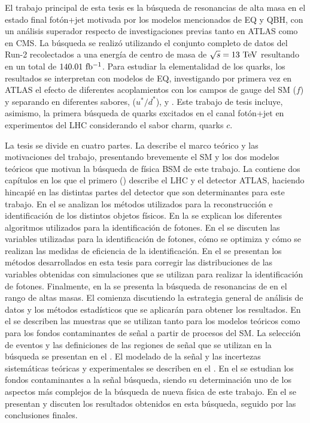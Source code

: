 El trabajo principal de esta tesis es la búsqueda de resonancias de alta masa en el estado final fotón+jet motivada por los modelos mencionados de \ac{EQ} y \ac{QBH}, con un análisis superador respecto de investigaciones previas tanto en \ac{ATLAS} como en \ac{CMS}. La búsqueda se realizó utilizando el conjunto completo de datos del Run-2 recolectados a una energía de centro de masa de \(\sqs = 13~\TeV\) resultando en un total de \(140.01~\ifb\). Para estudiar la elementalidad de los quarks, los resultados se interpretan con modelos de \ac{EQ}, investigando por primera vez en \ac{ATLAS} el efecto de diferentes acoplamientos con los campos de gauge del \ac{SM} (\(f\)) y separando en diferentes sabores, \qstar (\(u^*/d^*\)), \cstar y \bstar. Este trabajo de tesis incluye, asimismo, la primera búsqueda de quarks excitados en el canal fotón+jet en experimentos del \ac{LHC} considerando el sabor charm, quarks \(c\).

La tesis se divide en cuatro partes. La \Part{\ref{part:theory}} describe el marco teórico y las motivaciones del trabajo, presentando brevemente el \ac{SM} y los dos modelos teóricos que motivan la búsqueda de física \ac{BSM} de este trabajo. La \Part{\ref{part:exp_setup}} contiene dos capítulos en los que el primero (\Ch{\ref{ch:atlas}}) describe el \ac{LHC} y el detector \ac{ATLAS}, haciendo hincapié en las distintas partes del detector que son determinantes para este trabajo. En el \Ch{\ref{ch:objects}} se analizan los métodos utilizados para la reconstrucción e identificación de los distintos objetos físicos. En la \Part{\ref{part:pid}} se explican los diferentes algoritmos utilizados para la identificación de fotones. En el \Ch{\ref{ch:pid_ss}} se discuten las variables utilizadas para la identificación de fotones, cómo se optimiza y cómo se realizan las medidas de eficiencia de la identificación. En el \Ch{\ref{ch:ss_corrections}} se presentan los métodos desarrollados en esta tesis para corregir las distribuciones de las variables obtenidas con simulaciones que se utilizan para realizar la identificación de fotones. Finalmente, en la \Part{\ref{part:search}} se presenta la búsqueda de resonancias de \gammajet en el rango de altas masas. El \Ch{\ref{ch:strategy}} comienza discutiendo la estrategia general de análisis de datos y los métodos estadísticos que se aplicarán para obtener los resultados. En el \Ch{\ref{ch:samples}} se describen las muestras que se utilizan tanto para los modelos teóricos como para los fondos contaminantes de señal a partir de procesos del \ac{SM}. La selección de eventos y las definiciones de las regiones de señal que se utilizan en la búsqueda se presentan en el \Ch{\ref{ch:evt_selection}}. El modelado de la señal y las incertezas sistemáticas teóricas y experimentales se describen en el \Ch{\ref{ch:signals}}. En el \Ch{\ref{ch:bkg}} se estudian los fondos contaminantes a la señal búsqueda, siendo su determinación uno de los aspectos más complejos de la búsqueda de nueva física de este trabajo. En el \Ch{\ref{ch:results}} se presentan y discuten los resultados obtenidos en esta búsqueda, seguido por las conclusiones finales.